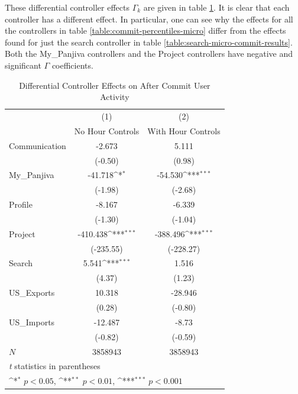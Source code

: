 \documentclass[10pt]{article}
\begin{document}
These differential controller effects $\Gamma_k$ are given in table \ref{table:gamma-effects}. It is clear that each controller has a different effect. In particular, one can see why the effects for all the controllers in table \ref{table:commit-percentiles-micro} differ from the effects found for just the search controller in table \ref{table:search-micro-commit-results}. Both the My\_Panjiva controllers and the Project controllers have negative and significant $\Gamma$ coefficients. 

\begin{table}[h!]
\centering
\caption{Differential Controller Effects on After Commit User Activity}
{
    \def\sym#1{\ifmmode^{#1}\else\(^{#1}\)\fi}
    \begin{tabular}{l*{2}{c}}
    \hline\hline
        &\multicolumn{1}{c}{(1)}&\multicolumn{1}{c}{(2)}\\
        &\multicolumn{1}{c}{No Hour Controls}&\multicolumn{1}{c}{With Hour Controls}\\
        \hline
        Communication & -2.673 & 5.111 \\
        & (-0.50) & (0.98) \\
        [1em]
        My\_Panjiva & -41.718\sym{*} & -54.530\sym{***} \\
        & (-1.98) & (-2.68) \\
        [1em]
        Profile & -8.167 & -6.339 \\
        & (-1.30) & (-1.04) \\
        [1em]
        Project & -410.438\sym{***} & -388.496\sym{***} \\
        & (-235.55) & (-228.27) \\
        [1em]
        Search & 5.541\sym{***} & 1.516 \\
        & (4.37) & (1.23) \\
        [1em]
        US\_Exports & 10.318 & -28.946 \\
        & (0.28) & (-0.80) \\
        [1em]
        US\_Imports & -12.487 & -8.73 \\
        & (-0.82) & (-0.59)\\
        \hline
        \(N\)       & 3858943  & 3858943   \\
        \hline \hline
        \multicolumn{3}{l}{\footnotesize \textit{t} statistics in parentheses}\\
        \multicolumn{3}{l}{\footnotesize \sym{*} \(p<0.05\), \sym{**} \(p<0.01\), \sym{***} \(p<0.001\)}\\
    \end{tabular}
}
\label{table:gamma-effects}
\end{table}
\end{document}
